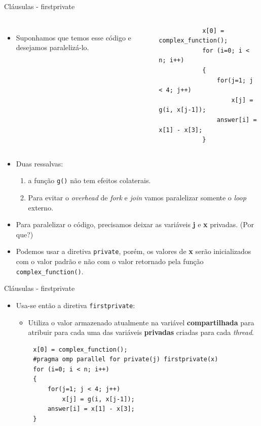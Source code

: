 \begin{frame}[fragile]{Cláusulas - firstprivate}
	\begin{columns}
		\begin{itemize}
			\item Suponhamos que temos esse código e desejamos paralelizá-lo.
		\end{itemize}
		\begin{verbatim}
			x[0] = complex_function();
			for (i=0; i < n; i++)
			{
				for(j=1; j < 4; j++)
					x[j] = g(i, x[j-1]);
				answer[i] = x[1] - x[3];
			}
		\end{verbatim}
	\end{columns}
	\pause
	\begin{itemize}
		\item Duas ressalvas:
		\smallskip
		\begin{enumerate}
			\item a função \texttt{g()} não tem efeitos colaterais.
			\smallskip
			\item Para evitar o \textit{overhead} de \textit{fork} e \textit{join} vamos paralelizar somente o \textit{loop} externo.
		\end{enumerate}
		\pause
		\item Para paralelizar o código, precisamos deixar as variáveis \textbf{j} e \textbf{x} privadas. ({\color{bostonuniversityred}Por que?})
		\pause
		\smallskip
		\item Podemos usar a diretiva \texttt{private}, porém, os valores de \textbf{x} serão inicializados com o valor padrão e não com o valor retornado pela função \texttt{complex\_function()}.
	\end{itemize}
\end{frame}

\begin{frame}[fragile]{Cláusulas - firstprivate}
	\begin{itemize}
		\item Usa-se então a diretiva \texttt{firstprivate}:
		\medskip
		\begin{itemize}
			\item Utiliza o valor armazenado atualmente na variável \textbf{compartilhada} para atribuir para cada uma das variáveis \textbf{privadas} criadas para cada \textit{thread}.
		\end{itemize}
	\end{itemize}
	\begin{verbatim}
		x[0] = complex_function();
		#pragma omp parallel for private(j) firstprivate(x)
		for (i=0; i < n; i++)
		{
			for(j=1; j < 4; j++)
				x[j] = g(i, x[j-1]);
			answer[i] = x[1] - x[3];
		}
	\end{verbatim}
\end{frame}

